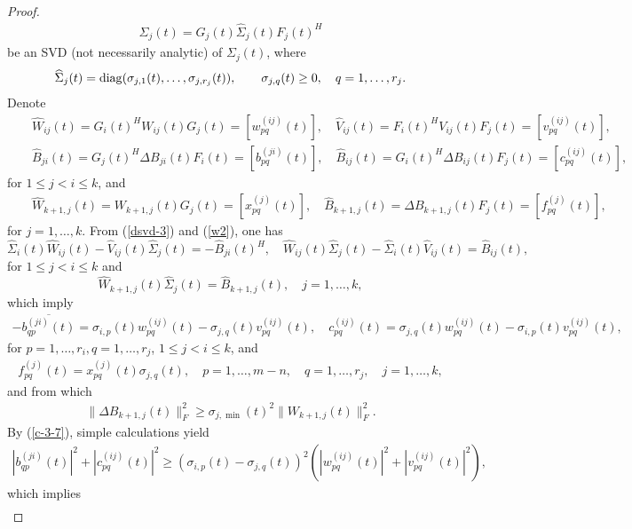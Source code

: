 \documentclass[11pt,a4paper]{article}
\numberwithin{equation}{section}
\newcommand {\wh} {\widehat}
\newcommand {\diag}  {\mathop{\rm diag}\nolimits}
\begin{document}
\begin{proof}
\begin{eqnarray*}
\Sigma_j(t)=G_j(t)\wh\Sigma_j(t)F_j(t)^H
\end{eqnarray*}
be an SVD (not necessarily analytic) of $\Sigma_j(t)$, where
\begin{eqnarray*}
\wh \Sigma_j(t)=\diag(\sigma_{j,1}(t),\ldots,\sigma_{j,r_j}(t)),\qquad \sigma_{j,q}(t)\geq 0, \quad q=1,\ldots,r_j.
\end{eqnarray*}
Denote
\begin{eqnarray*}
&&\wh W_{ij}(t)=G_i(t)^HW_{ij}(t)G_j(t)=[w_{pq}^{(ij)}(t)],\quad
\wh V_{ij}(t)=F_i(t)^HV_{ij}(t)F_j(t)=[v_{pq}^{(ij)}(t)],\\
&&\wh B_{ji}(t)=G_j(t)^H\Delta B_{ji}(t)F_i(t)=[b_{pq}^{(ji)}(t)],\quad
\wh B_{ij}(t)=G_i(t)^H\Delta B_{ij}(t)F_j(t)=[c_{pq}^{(ij)}(t)],
\end{eqnarray*}
for $1\le j<i\le k$, and
\begin{eqnarray*}
&&\wh W_{k+1,j}(t)=W_{k+1,j}(t)G_j(t)=[x_{pq}^{(j)}(t)],\quad
\wh B_{k+1,j}(t)=\Delta B_{k+1,j}(t)F_j(t)=[f_{pq}^{(j)}(t)],
\end{eqnarray*}
for $j=1,\ldots,k$. From (\ref{dsvd-3}) and (\ref{w2}), one has
\[
\wh\Sigma_i(t)\wh W_{ij}(t)-\wh V_{ij}(t)\wh \Sigma_j(t)=-\wh B_{ji}(t)^H,\quad
\wh W_{ij}(t)\wh\Sigma_j(t)-\wh \Sigma_i(t)\wh V_{ij}(t)=\wh B_{ij}(t),
\]
for $1\le j<i\le k$  and
\[
\wh W_{k+1,j}(t)\wh\Sigma_j(t)=\wh B_{k+1,j}(t),\quad j=1,\ldots,k,
\]
which imply
\begin{eqnarray}\label{c-3-7}
-\overline{b_{qp}^{(ji)}(t)} = \sigma_{i,p}(t)w_{pq}^{(ij)}(t)-\sigma_{j,q}(t)v_{pq}^{(ij)}(t),\quad
c_{pq}^{(ij)}(t)=\sigma_{j,q}(t)w_{pq}^{(ij)}(t)-\sigma_{i,p}(t)v_{pq}^{(ij)}(t),
\end{eqnarray}
for  $p=1,\ldots,r_i,q=1,\ldots,r_j$, $1\le j<i\le k$,
 and
\begin{eqnarray*}
f_{pq}^{(j)}(t) = x_{pq}^{(j)}(t)\sigma_{j,q}(t),\quad p=1,\ldots,m-n,\quad
q=1,\ldots,r_j,\quad j=1,\ldots,k,
\end{eqnarray*}
and from which
\begin{eqnarray}\label{c-3-8}
\|\Delta B_{k+1,j}(t)\|_F^2\ge
\sigma_{j,\min}(t)^2\|W_{k+1,j}(t)\|_F^2.
\end{eqnarray}
By (\ref{c-3-7}), simple calculations yield
\begin{eqnarray*}
|b_{qp}^{(ji)}(t)|^2+|c_{pq}^{(ij)}(t)|^2
\geq (\sigma_{i,p}(t)-\sigma_{j,q}(t))^2(|w_{pq}^{(ij)}(t)|^2+|v_{pq}^{(ij)}(t)|^2),
\end{eqnarray*}
which implies
\begin{eqnarray}\label{c-3-9}

\end{eqnarray}
\end{proof}
\end{document}
